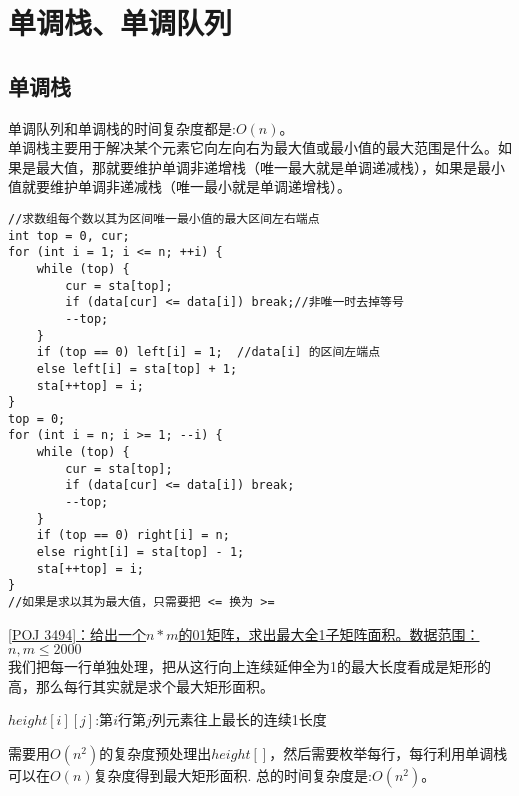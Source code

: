 \clearpage
\section{单调栈、单调队列}

\subsection{单调栈}
单调队列和单调栈的时间复杂度都是:$O(n)$。 \\
单调栈主要用于解决某个元素它向左向右为最大值或最小值的最大范围是什么。如果是最大值，那就要维护单调非递增栈（唯一最大就是单调递减栈），如果是最小值就要维护单调非递减栈（唯一最小就是单调递增栈）。
\begin{lstlisting}
//求数组每个数以其为区间唯一最小值的最大区间左右端点
int top = 0, cur;
for (int i = 1; i <= n; ++i) {
    while (top) {
        cur = sta[top];
        if (data[cur] <= data[i]) break;//非唯一时去掉等号
        --top;
    }
    if (top == 0) left[i] = 1;  //data[i] 的区间左端点
    else left[i] = sta[top] + 1;
    sta[++top] = i;
}
top = 0;
for (int i = n; i >= 1; --i) {
    while (top) {
        cur = sta[top];
        if (data[cur] <= data[i]) break;
        --top;
    }
    if (top == 0) right[i] = n;
    else right[i] = sta[top] - 1;
    sta[++top] = i;
}
//如果是求以其为最大值，只需要把 <= 换为 >=
\end{lstlisting}

\underline {[POJ 3494]：给出一个$n*m$的01矩阵，求出最大全1子矩阵面积。数据范围：$n,m\leq 2000$} \\


我们把每一行单独处理，把从这行向上连续延伸全为1的最大长度看成是矩形的高，那么每行其实就是求个最大矩形面积。 \\
\begin{center}
$height[i][j]$:第$i$行第$j$列元素往上最长的连续1长度
\end{center}
需要用$O(n^2)$的复杂度预处理出$height[]$，然后需要枚举每行，每行利用单调栈可以在$O(n)$复杂度得到最大矩形面积. 总的时间复杂度是:$O(n^2)$。

